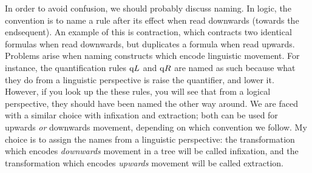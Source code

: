 In order to avoid confusion, we should probably discuss naming. In
logic, the convention is to name a rule after its effect when read
downwards (towards the endsequent). An example of this is contraction,
which contracts two identical formulas when read downwards, but
duplicates a formula when read upwards.
Problems arise when naming constructs which encode linguistic
movement. For instance, the quantification rules $\qup$ and $\qdown$
are named as such because what they do from a linguistic perspective
is raise the quantifier, and lower it. However, if you look up the
these rules, you will see that from a logical perspective, they should
have been named the other way around.
We are faced with a similar choice with infixation and extraction;
both can be used for upwards \emph{or} downwards movement, depending
on which convention we follow. My choice is to assign the names from a
linguistic perspective: the transformation which encodes
\emph{downwards} movement in a tree will be called infixation, and the
transformation which encodes \emph{upwards} movement will be called
extraction.



